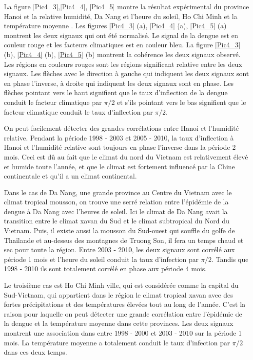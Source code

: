 La figure \ref{Pic4_3},\ref{Pic4_4}, \ref{Pic4_5} montre la résultat expérimental du province Hanoi et la relative humidité, Da Nang et l'heure du soleil, Ho Chi Minh et la température moyenne . Les figures \ref{Pic4_3} (a), \ref{Pic4_4} (a), \ref{Pic4_5} (a) montrent les deux signaux qui ont été normalisé. Le signal de la dengue est en couleur rouge et les facteurs climatiques est en couleur bleu. La figure  \ref{Pic4_3} (b), \ref{Pic4_4} (b), \ref{Pic4_5} (b) montrent la cohérence les deux signaux observé. Les régions en couleurs rouges sont les régions significant relative entre les deux signaux. Les flèches avec le direction à gauche qui indiquent les deux signaux sont en phase l'inverse, à droite qui indiquent les deux signaux sont en phase. Les flèches pointant vers le haut signifient que le taux d'inflection de la dengue conduit le facteur climatique par $\pi/2$ et s'ils pointant vers le bas signifient que le facteur climatique conduit le taux d'inflection par $\pi/2$. 

On peut facilement détecter des grandes corrélations entre Hanoi et l'humidité relative. Pendant la période 1998 - 2003 et 2005 - 2010, la taux d'inflection à Hanoi et l'humidité relative sont toujours en phase l'inverse dans la période 2 mois. Ceci est dû au fait que le climat du nord du Vietnam est relativement élevé et humide toute l'année, et que le climat est fortement influencé par la Chine continentale et qu'il a un climat continental.  

Dans le cas de Da Nang, une  grande province au Centre du Vietnam avec le climat tropical mousson, on trouve une  serré relation entre l'épidémie de la dengue à Da Nang avec l'heures de soleil.  Ici le climat de Da Nang avait la transition entre le climat xavan du Sud et le climat subtropical du Nord du Vietnam. Puis, il existe aussi la mousson du Sud-ouest qui souffle du golfe de Thaïlande et au-dessus des montagnes de Truong Son, il fera un temps chaud et sec pour toute la région. Entre 2003 - 2010, les deux signaux sont corrélé aux période 1 mois et l'heure du soleil conduit la taux d'infection par $\pi/2$. Tandis que  1998 - 2010 ils sont totalement corrélé en phase  aux période 4 mois. 

Le troisième cas est Ho Chi Minh ville, qui est considérée comme la capital du Sud-Vietnam, qui appartient dans le région le climat tropical xavan avec des fortes précipitations et des températures élevées tout au long de l'année. C'est la raison pour laquelle on peut détecter une grande corrélation entre l'épidémie de la dengue et la température moyenne dans cette provinces. Les deux signaux montrent une association dans entre 1998 - 2000 et 2003 - 2010 sur la période 1 mois. La température moyenne a totalement conduit le taux d'infection par  $\pi/2$ dans ces deux temps.



